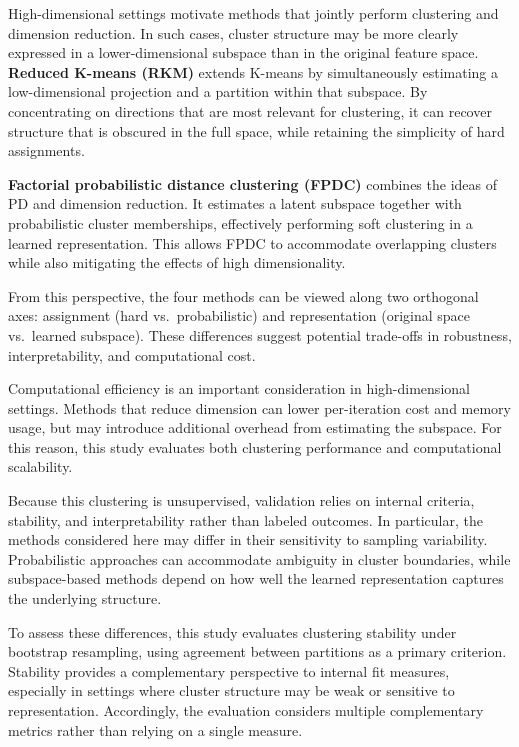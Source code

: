 \documentclass[
  11pt,
  letterpaper,
  DIV=11,
  numbers=noendperiod]{scrartcl}
\begin{document}
High-dimensional settings motivate methods that jointly perform
clustering and dimension reduction. In such cases, cluster structure may
be more clearly expressed in a lower-dimensional subspace than in the
original feature space. \textbf{Reduced K-means (RKM)} extends K-means
by simultaneously estimating a low-dimensional projection and a
partition within that subspace. By concentrating on directions that are
most relevant for clustering, it can recover structure that is obscured
in the full space, while retaining the simplicity of hard assignments.

\textbf{Factorial probabilistic distance clustering (FPDC)} combines the
ideas of PD and dimension reduction. It estimates a latent subspace
together with probabilistic cluster memberships, effectively performing
soft clustering in a learned representation. This allows FPDC to
accommodate overlapping clusters while also mitigating the effects of
high dimensionality.

From this perspective, the four methods can be viewed along two
orthogonal axes: assignment (hard vs.~probabilistic) and representation
(original space vs.~learned subspace). These differences suggest
potential trade-offs in robustness, interpretability, and computational
cost.

Computational efficiency is an important consideration in
high-dimensional settings. Methods that reduce dimension can lower
per-iteration cost and memory usage, but may introduce additional
overhead from estimating the subspace. For this reason, this study
evaluates both clustering performance and computational scalability.

Because this clustering is unsupervised, validation relies on internal
criteria, stability, and interpretability rather than labeled outcomes.
In particular, the methods considered here may differ in their
sensitivity to sampling variability. Probabilistic approaches can
accommodate ambiguity in cluster boundaries, while subspace-based
methods depend on how well the learned representation captures the
underlying structure.

To assess these differences, this study evaluates clustering stability
under bootstrap resampling, using agreement between partitions as a
primary criterion. Stability provides a complementary perspective to
internal fit measures, especially in settings where cluster structure
may be weak or sensitive to representation. Accordingly, the evaluation
considers multiple complementary metrics rather than relying on a single
measure.
\end{document}
